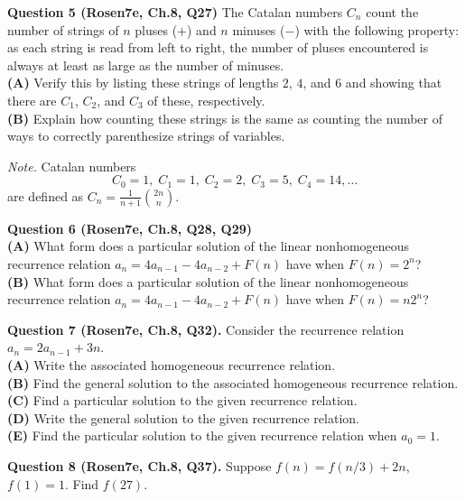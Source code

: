 \documentclass[jou]{apa6}
\begin{document}
\vspace{10pt}
{\bf Question 5 (Rosen7e, Ch.8, Q27)} 
The Catalan numbers $C_n$ count the number of strings of $n$ pluses ($+$) and $n$ minuses ($-$)
with the following property: as each
string is read from left to right, the number of pluses encountered is always 
at least as large as the number of minuses.\\
{\bf (A)} Verify this by listing these strings of lengths $2$, 
$4$, and $6$ and showing that there are $C_1$, $C_2$, and $C_3$ of
these, respectively.\\
{\bf (B)} Explain how counting these strings is the same as counting 
the number of ways to correctly parenthesize strings of variables.

{\em Note.} Catalan numbers 
$$C_0=1,\; C_1=1,\; C_2=2,\; C_3=5,\; C_4=14,\ldots$$
are defined as ${\displaystyle C_n = \frac{1}{n+1}{2n \choose n}}$.

\vspace{10pt}
{\bf Question 6  (Rosen7e, Ch.8, Q28, Q29)}\\
{\bf (A)} What form does a particular solution of the linear nonhomogeneous 
recurrence relation $a_n = 4a_{n-1} - 4a_{n-2} + F(n)$ have when $F(n) = 2^n$?\\
{\bf (B)} What form does a particular solution of the linear nonhomogeneous 
recurrence relation $a_n = 4a_{n-1} - 4a_{n-2} + F(n)$ have when $F(n) = n2^n$?


 

\vspace{10pt}
{\bf Question 7 (Rosen7e, Ch.8, Q32).}
Consider the recurrence relation $a_n = 2a_{n-1} + 3n$.\\
{\bf (A)} Write the associated homogeneous recurrence relation.\\
{\bf (B)} Find the general solution to the associated homogeneous recurrence relation.\\
{\bf (C)} Find a particular solution to the given recurrence relation.\\
{\bf (D)} Write the general solution to the given recurrence relation.\\
{\bf (E)} Find the particular solution to the given recurrence relation when $a_0 = 1$.


\vspace{10pt}
{\bf Question 8 (Rosen7e, Ch.8, Q37).} 
Suppose $f(n) = f(n/3) + 2n$, $f(1) = 1$. Find $f(27)$.
\end{document}
